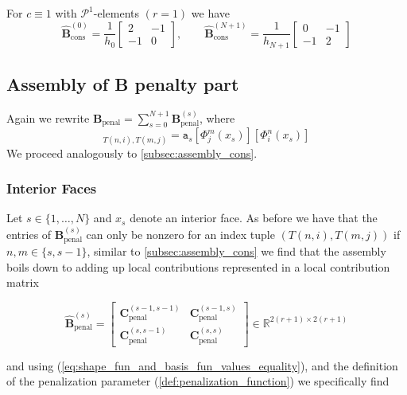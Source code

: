 \begin{example}
	For $c\equiv 1$ with $\mathcal{P}^1$-elements $(r=1)$ we have
	\begin{equation*}
		\widehat{\textbf{B}}_{\text{cons}}^{(0)} = \frac{1}{h_0}
		\begin{bmatrix}
			2  & -1 \\
			-1 & 0
		\end{bmatrix}
		,\qquad
		\widehat{\textbf{B}}_{\text{cons}}^{(N+1)} = \frac{1}{h_{N+1}}
		\begin{bmatrix}
			0  & -1 \\
			-1 & 2
		\end{bmatrix}
	\end{equation*}
\end{example}

\subsection{Assembly of B penalty part}
Again we rewrite $\textbf{B}_{\text{penal}} = \sum_{s=0}^{N+1} \textbf{B}_{\text{penal}}^{(s)}$, where
\begin{equation*}
	[\textbf{B}_{\text{penal}}^{(s)}]_{T(n,i), T(m,j)} = { \texttt{a}_s} [\Phi_j^m(x_s)] [\Phi_i^n(x_s)]
\end{equation*}
We proceed analogously to \ref{subsec:assembly_cons}.
\subsubsection{Interior Faces}
Let $s\in \{1,\ldots,N\} $ and $x_s$ denote an interior face. As before we have that
the entries of $ \textbf{B}_{\text{penal}}^{(s)} $ can only be nonzero for an index tuple
$ (T(n,i), T(m,j)) $ if $ n,m \in \{s, s-1\} $, similar to \ref{subsec:assembly_cons} we find
that the assembly boils down to adding up local contributions represented in a local contribution
matrix

\begin{equation*}
	\widehat{\textbf{B}}_{\text{penal}}^{(s)} =
	\begin{bmatrix}
		\textbf{C}_{\text{penal}}^{(s-1,s-1)} & \textbf{C}_{\text{penal}}^{(s-1,s)} \\
		\textbf{C}_{\text{penal}}^{(s,s-1)}   & \textbf{C}_{\text{penal}}^{(s,s)}
	\end{bmatrix}
	\in \mathbb{R}^{2(r+1) \times 2(r+1)}
\end{equation*}

and using (\ref{eq:shape_fun_and_basis_fun_values_equality}), and the definition of the penalization
parameter (\ref{def:penalization_function}) we specifically find

